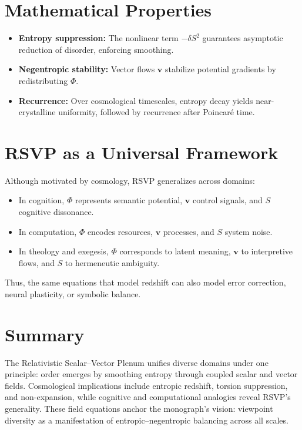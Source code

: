 \documentclass[a4paper,11pt,openany]{book}
\begin{document}
\section{Mathematical Properties}

\begin{itemize}
  \item \textbf{Entropy suppression:} The nonlinear term $-\delta S^2$ guarantees 
  asymptotic reduction of disorder, enforcing smoothing.
  \item \textbf{Negentropic stability:} Vector flows $\mathbf{v}$ stabilize potential 
  gradients by redistributing $\Phi$.
  \item \textbf{Recurrence:} Over cosmological timescales, entropy decay yields near-crystalline 
  uniformity, followed by recurrence after Poincaré time.
\end{itemize}

\section{RSVP as a Universal Framework}

Although motivated by cosmology, RSVP generalizes across domains:
\begin{itemize}
  \item In cognition, $\Phi$ represents semantic potential, $\mathbf{v}$ control signals, 
  and $S$ cognitive dissonance.
  \item In computation, $\Phi$ encodes resources, $\mathbf{v}$ processes, and $S$ system noise.
  \item In theology and exegesis, $\Phi$ corresponds to latent meaning, $\mathbf{v}$ to 
  interpretive flows, and $S$ to hermeneutic ambiguity.
\end{itemize}
Thus, the same equations that model redshift can also model error correction, neural plasticity, 
or symbolic balance.

\section{Summary}

The Relativistic Scalar–Vector Plenum unifies diverse domains under one principle: order 
emerges by smoothing entropy through coupled scalar and vector fields. Cosmological 
implications include entropic redshift, torsion suppression, and non-expansion, while 
cognitive and computational analogies reveal RSVP’s generality. These field equations 
anchor the monograph’s vision: viewpoint diversity as a manifestation of entropic–negentropic 
balancing across all scales.
\end{document}
